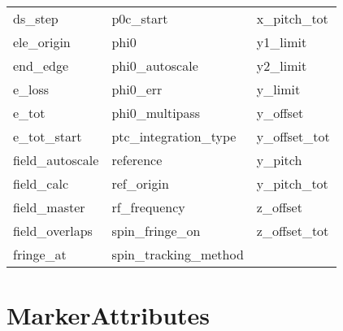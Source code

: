 \begin{tabular}{lll}
ds_step                     & p0c_start                   & x_pitch_tot                 \\
ele_origin                  & phi0                        & y1_limit                    \\
end_edge                    & phi0_autoscale              & y2_limit                    \\
e_loss                      & phi0_err                    & y_limit                     \\
e_tot                       & phi0_multipass              & y_offset                    \\
e_tot_start                 & ptc_integration_type        & y_offset_tot                \\
field_autoscale             & reference                   & y_pitch                     \\
field_calc                  & ref_origin                  & y_pitch_tot                 \\
field_master                & rf_frequency                & z_offset                    \\
field_overlaps              & spin_fringe_on              & z_offset_tot                \\
fringe_at                   & spin_tracking_method        &                             \\
 \bottomrule
 \end{tabular}
 \vfill
 
 \section{MarkerAttributes}
 \label{s:list.marker}
 
